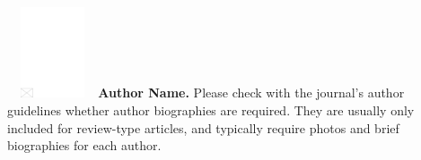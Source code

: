 \documentclass[AMA,Times1COL]{WileyNJDv5} %
\begin{document}
\nocite{*}%



\begin{biography}{\includegraphics[width=76pt,height=76pt,draft]{empty}}{
{\textbf{Author Name.} Please check with the journal's author guidelines whether
author biographies are required. They are usually only included for
review-type articles, and typically require photos and brief
biographies for each author.}}
\end{biography}
\end{document}
